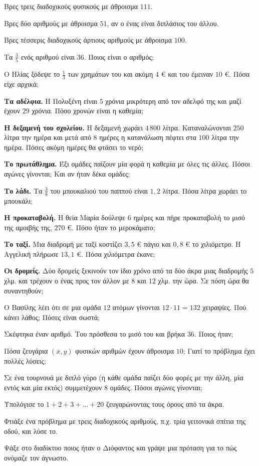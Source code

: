 

\ex Βρες τρεις διαδοχικούς φυσικούς με άθροισμα $111$.

\ex Βρες δύο αριθμούς με άθροισμα $51$, αν ο ένας είναι διπλάσιος του άλλου.

\ex Βρες τέσσερις διαδοχικούς άρτιους αριθμούς με άθροισμα $100$.

\ex Τα $\frac{3}{5}$ ενός αριθμού είναι $36$. Ποιος είναι ο αριθμός;

\ex Ο Ηλίας ξόδεψε το $\frac{1}{3}$ των χρημάτων του και ακόμη $4$ € και του έμειναν $10$ €. Πόσα είχε αρχικά;


\ex \textbf{Τα αδέλφια.} Η Πολυξένη είναι $5$ χρόνια μικρότερη από τον αδελφό της και μαζί έχουν $29$ χρόνια. Πόσο χρονών είναι η καθεμία;

\ex \textbf{Η δεξαμενή του σχολείου.} Η δεξαμενή χωράει $4\,800$ λίτρα. Καταναλώνονται $250$ λίτρα την ημέρα και μετά από $8$ ημέρες η κατανάλωση πέφτει στα $100$ λίτρα την ημέρα. Πόσες ακόμη ημέρες θα φτάσει το νερό;

\ex \textbf{Το πρωτάθλημα.} Έξι ομάδες παίζουν μία φορά η καθεμία με όλες τις άλλες. Πόσοι αγώνες γίνονται; Και αν ήταν δέκα ομάδες;

\ex \textbf{Το λάδι.} Τα $\frac{3}{8}$ του μπουκαλιού του παππού είναι $1{,}2$ λίτρα. Πόσα λίτρα χωράει το μπουκάλι;

\ex \textbf{Η προκαταβολή.} Η θεία Μαρία δούλεψε $6$ ημέρες και πήρε προκαταβολή το μισό της αμοιβής της, $270$ €. Πόσο ήταν το μεροκάματο;

\ex \textbf{Το ταξί.} Μια διαδρομή με ταξί κοστίζει $3{,}5$ € πάγιο και $0{,}8$ € το χιλιόμετρο. Η Αγγελική πλήρωσε $13{,}1$ €. Πόσα χιλιόμετρα έκανε;

\ex \textbf{Οι δρομείς.} Δύο δρομείς ξεκινούν τον ίδιο χρόνο από τα δύο άκρα μιας διαδρομής $5$ χλμ. και τρέχουν ο ένας προς τον άλλον με $8$ και $12$ χλμ. την ώρα. Σε πόση ώρα θα συναντηθούν;


\ex Ο Βασίλης λέει ότι σε μια ομάδα $12$ ατόμων γίνονται $12\cdot11=132$ χειραψίες. Πού κάνει λάθος; Πόσες είναι σωστά;

\ex Σκέφτηκα έναν αριθμό. Του πρόσθεσα το μισό του και βρήκα $36$. Ποιος ήταν;

\ex Πόσα ζευγάρια $(x,y)$ φυσικών αριθμών έχουν άθροισμα $10$; Γιατί το πρόβλημα έχει πολλές λύσεις;

\ex Σε ένα τουρνουά με διπλό γύρο (η κάθε ομάδα παίζει δύο φορές με την άλλη, μία εντός και μία εκτός) συμμετέχουν $8$ ομάδες. Πόσοι αγώνες γίνονται;

\ex Υπολόγισε το $1+2+3+\dots+20$ ζευγαρώνοντας τους όρους από τα άκρα.


\ex Φτιάξε ένα πρόβλημα με τρεις διαδοχικούς αριθμούς, π.χ. τρία γειτονικά σπίτια της οδού, και λύσε το.

\ex Ψάξε στο διαδίκτυο ποιος ήταν ο Διόφαντος και γράψε μια πρόταση για το πώς ονόμαζε τον άγνωστο.
